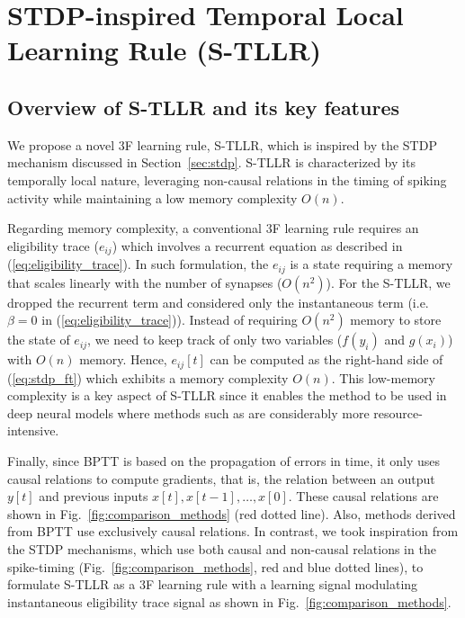 \documentclass[10pt]{article} %
\begin{document}
\section{STDP-inspired Temporal Local Learning Rule (S-TLLR)}\label{sec:tllr}
    \subsection{Overview of S-TLLR and its key features}
    We propose a novel 3F learning rule, S-TLLR, which is inspired by the STDP mechanism discussed in Section~\ref{sec:stdp}.
    S-TLLR is characterized by its temporally local nature, leveraging non-causal relations in the timing of spiking activity while maintaining a low memory complexity $O(n)$.


    Regarding memory complexity, a conventional 3F learning rule requires an eligibility trace ($e_{ij}$) which involves a recurrent equation as described in (\ref{eq:eligibility_trace}). 
    In such formulation, the $e_{ij}$ is a state requiring a memory that scales linearly with the number of synapses ($O(n^2)$). 
    For the S-TLLR, we dropped the recurrent term and considered only the instantaneous term (i.e. $\beta = 0$ in (\ref{eq:eligibility_trace})). 
    Instead of requiring $O(n^2)$ memory to store the state of $e_{ij}$, we need to keep track of only two variables ($f(y_i)$ and $g(x_i)$) with $O(n)$ memory.
    Hence, $e_{ij}[t]$ can be computed as the right-hand side of (\ref{eq:stdp_ft}) which exhibits a memory complexity $O(n)$. 
    This low-memory complexity is a key aspect of S-TLLR since it enables the method to be used in deep neural models where methods such as \cite{WILLIAMS1989ExperimentalAlgorithm, Bellec2020ANeurons, Bohnstingl2022OnlineNetworks, Ortner2023OnlineProjection, Quintana2023ETLP:Hardware} are considerably more resource-intensive. 

    Finally, since BPTT is based on the propagation of errors in time, it only uses causal relations to compute gradients, that is, the relation between an output $y[t]$ and previous inputs $x[t], x[t-1], \dots, x[0]$.
    These causal relations are shown in   Fig.~\ref{fig:comparison_methods} (red dotted line).
    Also, methods derived from BPTT \citep{Bellec2020ANeurons, Bohnstingl2022OnlineNetworks, Ortner2023OnlineProjection, Quintana2023ETLP:Hardware, Xiao2022OnlineNetworks} use exclusively causal relations.
    In contrast, we took inspiration from the STDP mechanisms, which use both causal and non-causal relations in the spike-timing (Fig.~\ref{fig:comparison_methods}, red and blue dotted lines), to formulate S-TLLR as a 3F learning rule with a learning signal modulating instantaneous eligibility trace signal as shown in Fig.~\ref{fig:comparison_methods}.
    
\end{document}
